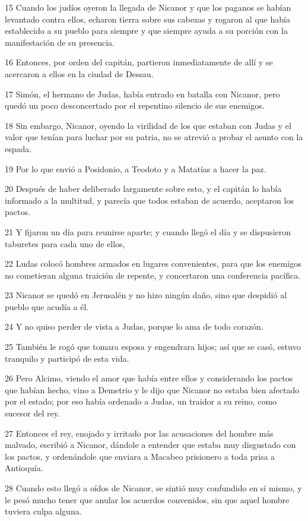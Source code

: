 \par 15 Cuando los judíos oyeron la llegada de Nicanor y que los paganos se habían levantado contra ellos, echaron tierra sobre sus cabezas y rogaron al que había establecido a su pueblo para siempre y que siempre ayuda a su porción con la manifestación de su presencia.
\par 16 Entonces, por orden del capitán, partieron inmediatamente de allí y se acercaron a ellos en la ciudad de Dessau.
\par 17 Simón, el hermano de Judas, había entrado en batalla con Nicanor, pero quedó un poco desconcertado por el repentino silencio de sus enemigos.
\par 18 Sin embargo, Nicanor, oyendo la virilidad de los que estaban con Judas y el valor que tenían para luchar por su patria, no se atrevió a probar el asunto con la espada.
\par 19 Por lo que envió a Posidonio, a Teodoto y a Matatías a hacer la paz.
\par 20 Después de haber deliberado largamente sobre esto, y el capitán lo había informado a la multitud, y parecía que todos estaban de acuerdo, aceptaron los pactos.
\par 21 Y fijaron un día para reunirse aparte; y cuando llegó el día y se dispusieron taburetes para cada uno de ellos,
\par 22 Ludas colocó hombres armados en lugares convenientes, para que los enemigos no cometieran alguna traición de repente, y concertaron una conferencia pacífica.
\par 23 Nicanor se quedó en Jerusalén y no hizo ningún daño, sino que despidió al pueblo que acudía a él.
\par 24 Y no quiso perder de vista a Judas, porque lo ama de todo corazón.
\par 25 También le rogó que tomara esposa y engendrara hijos; así que se casó, estuvo tranquilo y participó de esta vida.
\par 26 Pero Alcimo, viendo el amor que había entre ellos y considerando los pactos que habían hecho, vino a Demetrio y le dijo que Nicanor no estaba bien afectado por el estado; por eso había ordenado a Judas, un traidor a su reino, como sucesor del rey.
\par 27 Entonces el rey, enojado y irritado por las acusaciones del hombre más malvado, escribió a Nicanor, dándole a entender que estaba muy disgustado con los pactos, y ordenándole que enviara a Macabeo prisionero a toda prisa a Antioquía.
\par 28 Cuando esto llegó a oídos de Nicanor, se sintió muy confundido en sí mismo, y le pesó mucho tener que anular los acuerdos convenidos, sin que aquel hombre tuviera culpa alguna.
